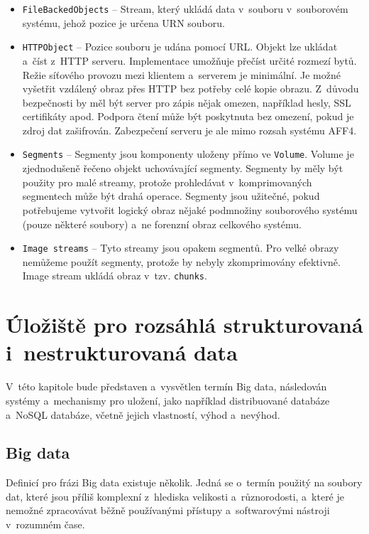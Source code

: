 \begin{itemize}
\item \texttt{FileBackedObjects} -- Stream, který ukládá data v~souboru v~souborovém systému, jehož pozice je určena URN souboru.

\item \texttt{HTTPObject} -- Pozice souboru je udána pomocí URL. Objekt lze ukládat a~číst z~HTTP serveru. Implementace umožňuje přečíst určité rozmezí bytů. Režie síťového provozu mezi klientem a~serverem je minimální. Je možné vyšetřit vzdálený obraz přes HTTP bez potřeby celé kopie obrazu. Z~důvodu bezpečnosti by měl být server pro zápis nějak omezen, například hesly, SSL certifikáty apod. Podpora čtení může být poskytnuta bez omezení, pokud je zdroj dat zašifrován. Zabezpečení serveru je ale mimo rozsah systému AFF4.

\item \texttt{Segments} -- Segmenty jsou komponenty uloženy přímo ve \texttt{Volume}. Volume je zjednodušeně řečeno objekt uchovávající segmenty. Segmenty by měly být použity pro malé streamy, protože prohledávat v~komprimovaných segmentech může být drahá operace. Segmenty jsou užitečné, pokud potřebujeme vytvořit logický obraz nějaké podmnožiny souborového systému (pouze některé soubory) a~ne forenzní obraz celkového systému.

\item \texttt{Image streams} -- Tyto streamy jsou opakem segmentů. Pro velké obrazy nemůžeme použít segmenty, protože by nebyly zkomprimovány efektivně. Image stream ukládá obraz v~tzv. \texttt{chunks}.
\end{itemize}

\chapter{Úložiště pro rozsáhlá strukturovaná i~nestrukturovaná data} \label{chapter2}
V~této kapitole bude představen a~vysvětlen termín Big data, následován systémy a~mechanismy pro uložení, jako například distribuované databáze a~NoSQL databáze, včetně jejich vlastností, výhod a~nevýhod.

\section{Big data} \label{bigDataSection}
Definicí pro frázi Big data existuje několik. Jedná se o~termín použitý na soubory dat, které jsou příliš komplexní z~hlediska velikosti a~různorodosti, a~které je nemožné zpracovávat běžně používanými přístupy a~softwarovými nástroji v~rozumném čase.

